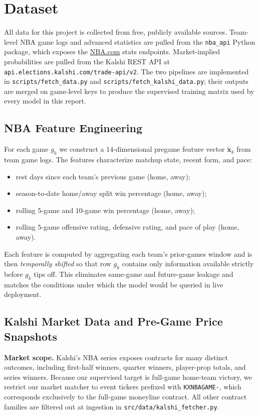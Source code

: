 \section{Dataset}
\label{sec:dataset}

All data for this project is collected from free, publicly available
sources. Team-level NBA game logs and advanced statistics are pulled
from the \texttt{nba\_api} Python package, which exposes the
\href{https://stats.nba.com}{NBA.com} stats endpoints. Market-implied
probabilities are pulled from the Kalshi REST API at
\texttt{api.elections.kalshi.com/trade-api/v2}. The two pipelines are
implemented in \texttt{scripts/fetch\_data.py} and
\texttt{scripts/fetch\_kalshi\_data.py}; their outputs are merged on
game-level keys to produce the supervised training matrix used by every
model in this report.

\subsection{NBA Feature Engineering}

For each game $g_k$ we construct a $14$-dimensional pregame feature
vector $\tilde{\mathbf{x}}_k$ from team game logs. The features
characterize matchup state, recent form, and pace:
\begin{itemize}
    \setlength\itemsep{0pt}
    \item rest days since each team's previous game (home, away);
    \item season-to-date home/away split win percentage (home, away);
    \item rolling $5$-game and $10$-game win percentage (home, away);
    \item rolling $5$-game offensive rating, defensive rating, and pace
          of play (home, away).
\end{itemize}
Each feature is computed by aggregating each team's prior-games window
and is then \emph{temporally shifted} so that row $g_k$ contains only
information available strictly before $g_k$ tips off. This eliminates
same-game and future-game leakage and matches the conditions under
which the model would be queried in live deployment.

\subsection{Kalshi Market Data and Pre-Game Price Snapshots}

\textbf{Market scope.}
Kalshi's NBA series exposes contracts for many distinct outcomes,
including first-half winners, quarter winners, player-prop totals, and
series winners. Because our supervised target is full-game home-team
victory, we restrict our market matcher to event tickers prefixed with
\texttt{KXNBAGAME-}, which corresponds exclusively to the full-game
moneyline contract. All other contract families are filtered out at
ingestion in \texttt{src/data/kalshi\_fetcher.py}.

